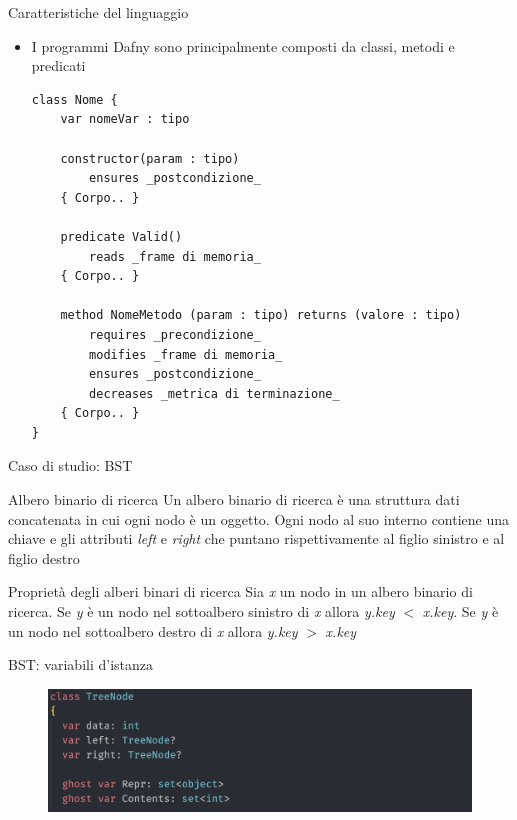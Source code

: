 \documentclass{beamer}
\begin{document}
\begin{frame}[containsverbatim]{Caratteristiche del linguaggio}
        \begin{itemize}
            \item I programmi Dafny sono principalmente composti da classi, metodi e predicati
            \begin{lstlisting}[basicstyle=\tiny]
class Nome {
    var nomeVar : tipo
    
    constructor(param : tipo)
        ensures _postcondizione_
    { Corpo.. }

    predicate Valid()
        reads _frame di memoria_
    { Corpo.. }

    method NomeMetodo (param : tipo) returns (valore : tipo)
        requires _precondizione_
        modifies _frame di memoria_
        ensures _postcondizione_
        decreases _metrica di terminazione_
    { Corpo.. }
}
            \end{lstlisting}
        \end{itemize}
\end{frame}

\begin{frame}{Caso di studio: BST}
    \begin{block}{Albero binario di ricerca}
        Un albero binario di ricerca è una struttura dati concatenata in cui ogni nodo è un oggetto.
        Ogni nodo al suo interno contiene una chiave e gli attributi \textit{left} e \textit{right} che puntano
        rispettivamente al figlio sinistro e al figlio destro
    \end{block}
    \begin{block}{Proprietà degli alberi binari di ricerca}
        Sia \textit{x} un nodo in un albero binario di ricerca. Se \textit{y} è un nodo nel sottoalbero sinistro
        di \textit{x} allora \textit{y.key} $< $ \textit{x.key}. Se \textit{y} è un nodo nel sottoalbero destro
        di \textit{x} allora \textit{y.key} $> $ \textit{x.key}
    \end{block}
\end{frame}

\begin{frame}{BST: variabili d'istanza}
    \begin{figure}
        \includegraphics[scale=0.5]{./assets/images/screenshots/instance.png}
    \end{figure}
\end{frame}
\end{document}
